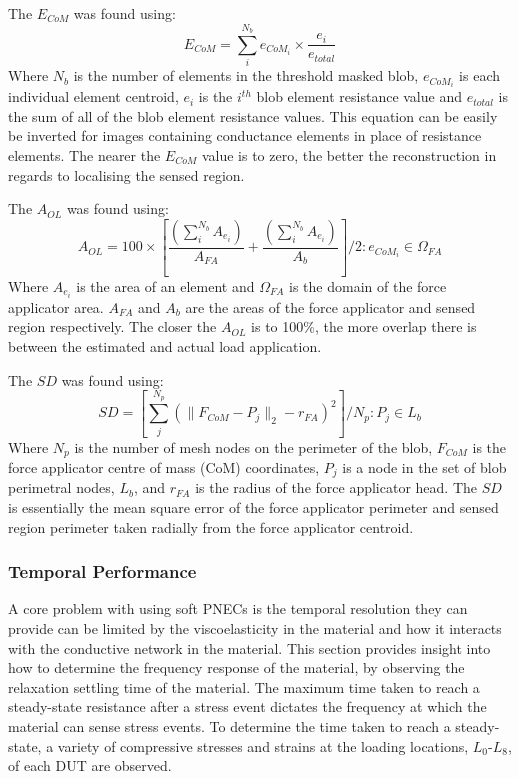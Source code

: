 The $E_{CoM}$ was found using:
\begin{equation}
    E_{CoM} = \sum_i^{N_{b}} e_{{CoM}_i} \times \frac{e_i}{e_{total}}
    \label{eqn:err_CoM}
\end{equation}
Where $N_{b}$ is the number of elements in the threshold masked blob, $e_{{CoM}_i}$ is each individual element centroid, $e_i$ is the $i^{th}$ blob element resistance value and $e_{total}$ is the sum of all of the blob element resistance values. This equation can be easily be inverted for images containing conductance elements in place of resistance elements. The nearer the $E_{CoM}$ value is to zero, the better the reconstruction in regards to localising the sensed region.

The $A_{OL}$ was found using:
\begin{equation}
    A_{OL} = 100\times\left[\frac{\left(\sum_i^{N_{b}} A_{e_i}\right)}{A_{FA}} + \frac{\left(\sum_i^{N_{b}} A_{e_i}\right)}{A_{b}}\right]\bigg/2 : e_{{CoM}_i} \in \Omega_{FA}
    \label{eqn:area_overlap}
\end{equation}
Where $A_{e_i}$ is the area of an element and $\Omega_{FA}$ is the domain of the force applicator area. $A_{FA}$ and $A_{b}$ are the areas of the force applicator and sensed region respectively. The closer the $A_{OL}$ is to 100\%, the more overlap there is between the estimated and actual load application.

The $S\!D$ was found using:
\begin{equation}
    S\!D = \left[\sum_j^{N_p} \left(\|F_{CoM} - P_j\|_2 - r_{FA}\right)^2\right] \bigg/ N_p : P_j \in L_{b}
    \label{eqn:shape_deform}
\end{equation}
Where $N_p$ is the number of mesh nodes on the perimeter of the blob, $F_{CoM}$ is the force applicator centre of mass (CoM) coordinates, $P_j$ is a node in the set of blob perimetral nodes, $L_{b}$, and $r_{FA}$ is the radius of the force applicator head. The $S\!D$ is essentially the mean square error of the force applicator perimeter and sensed region perimeter taken radially from the force applicator centroid.


\subsubsection{Temporal Performance}\label{sec:Temporal Performance}
A core problem with using soft PNECs is the temporal resolution they can provide can be limited by the viscoelasticity in the material and how it interacts with the conductive network in the material. This section provides insight into how to determine the frequency response of the material, by observing the relaxation settling time of the material. The maximum time taken to reach a steady-state resistance after a stress event dictates the frequency at which the material can sense stress events. To determine the time taken to reach a steady-state, a variety of compressive stresses and strains at the loading locations, $L_0$-$L_8$, of each DUT are observed. 


